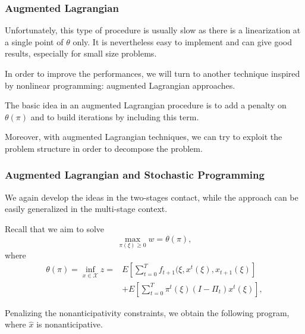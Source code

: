 \documentclass[french]{beamer}
\begin{document}
\begin{frame}
\frametitle{Augmented Lagrangian}

Unfortunately, this type of procedure is usually slow as there is a linearization at a single point of $\theta$ only.
It is nevertheless easy to implement and can give good results, especially for small size problems.

\mbox{}

In order to improve the performances, we will turn to another technique inspired by nonlinear programming: {\blue augmented Lagrangian} approaches.

\mbox{}

The basic idea in an augmented Lagrangian procedure is to add a penalty on $\theta(\pi)$ and to build iterations by including this term.

\mbox{}

Moreover, with augmented Lagrangian techniques, we can try to exploit the problem structure in order to decompose the problem.

\end{frame}






\begin{frame}
\frametitle{Augmented Lagrangian and Stochastic Programming}

We again develop the ideas in the two-stages contact, while the approach can be easily generalized in the multi-stage context.

\mbox{}

Recall that we aim to solve
\[
\max_{\pi(\xi) \geq 0} w = \theta(\pi),
\]
where
\begin{align*}
\theta(\pi) = \inf_{x \in \mathcal{X}} z = & 
E\left[\sum_{t = 0}^T f_{t+1} (\xi, x^t(\xi), x_{t+1}(\xi) \right] \\
& + E\left[\sum_{t = 0}^T \pi^t(\xi)(I-\Pi_t)x^t(\xi) \right],
\end{align*}

Penalizing the nonanticipativity constraints, we obtain the following program, where $\hat{x}$ is nonanticipative.

\end{frame}
\end{document}

